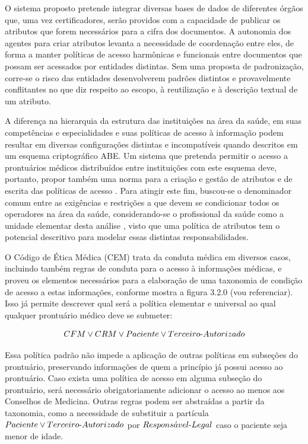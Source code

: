 \documentclass[a4paper,11pt]{article}
\begin{document}
O sistema proposto pretende integrar diversas bases de dados de diferentes órgãos que, uma vez  certificadores, serão providos com a capacidade de publicar os atributos que forem necessários para a cifra dos documentos. A autonomia dos agentes para criar atributos levanta a necessidade de coordenação entre eles, de forma a manter políticas de acesso harmônicas e funcionais entre documentos que possam ser acessados por entidades distintas. Sem uma proposta de padronização, corre-se o risco das entidades desenvolverem padrões distintos e provavelmente conflitantes no que diz respeito ao escopo, à reutilização e à descrição textual de um atributo.

A diferença na hierarquia da estrutura das instituições na área da saúde, em suas competências e especialidades e suas políticas de acesso à informação podem resultar em diversas configurações distintas e incompatíveis quando descritos em um esquema criptográfico ABE. Um sistema que pretenda permitir o acesso a prontuários médicos distribuídos entre instituições com este esquema deve, portanto, propor também uma norma para a criação e gestão de atributos e de escrita das políticas de acesso . Para atingir este fim, buscou-se o denominador comum entre as exigências e restrições a que devem se condicionar todos os operadores na área da saúde, considerando-se o profissional da saúde como a unidade elementar desta análise , visto que uma política de atributos tem o potencial descritivo para modelar essas distintas responsabilidades.

O Código de Ética Médica (CEM) trata da conduta médica em diversos casos, incluindo também regras de conduta para o acesso à informações médicas, e proveu os elementos necessários para a elaboração de uma taxonomia de condição de acesso a estas informações, conforme mostra a figura 3.2.0 {\color{RoyalBlue}(vou referenciar)}. Isso já permite descrever qual será a política elementar e universal ao qual qualquer prontuário médico deve se submeter:

\[ CFM \vee CRM \vee Paciente \vee Terceiro\textnormal{-}Autorizado \]

Essa política padrão não impede a aplicação de outras políticas em subseções do prontuário, preservando informações de quem a princípio já possui acesso ao prontuário. Caso exista uma política de acesso em alguma subseção do prontuário, será necessário obrigatoriamente adicionar o acesso ao menos aos Conselhos de Medicina. Outras regras podem ser abstraídas a partir da taxonomia, como a necessidade de substituir a partícula $Paciente \vee Terceiro\textnormal{-}Autorizado$ por $Respons\acute{a}vel\textnormal{-}Legal$ caso o paciente seja menor de idade.
\end{document}
